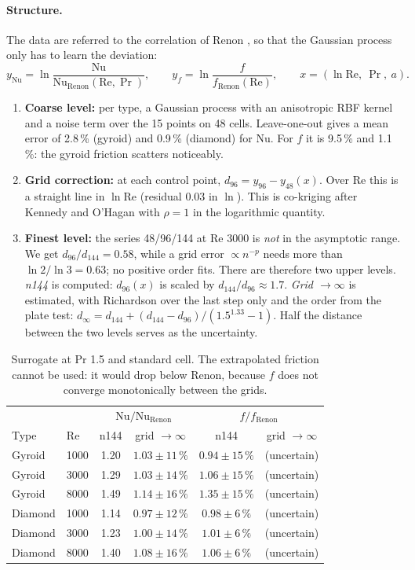 \paragraph{Structure.} The data are referred to the correlation of Renon \cite{renon2024}, so that the Gaussian process
only has to learn the deviation:
\[
  y_\mathrm{Nu} = \ln\frac{\mathrm{Nu}}{\mathrm{Nu}_\mathrm{Renon}(\mathrm{Re},\Pr)},\qquad
  y_f = \ln\frac{f}{f_\mathrm{Renon}(\mathrm{Re})},\qquad x = (\ln\mathrm{Re},\ \Pr,\ a).
\]
\begin{enumerate}
\item \textbf{Coarse level:} per type, a Gaussian process with an anisotropic RBF kernel and a noise term over the 15
  points on 48 cells. Leave-one-out gives a mean error of 2.8\,\% (gyroid) and 0.9\,\% (diamond) for Nu. For $f$ it is
  9.5\,\% and 1.1\,\%: the gyroid friction scatters noticeably.
\item \textbf{Grid correction:} at each control point, $d_{96} = y_{96} - y_{48}(x)$. Over Re this is a straight line in
  $\ln\mathrm{Re}$ (residual 0.03 in $\ln$). This is co-kriging after Kennedy and O'Hagan \cite{kennedy2000} with
  $\rho = 1$ in the logarithmic quantity.
\item \textbf{Finest level:} the series 48/96/144 at Re 3000 is \emph{not} in the asymptotic range. We get
  $d_{96}/d_{144} = 0.58$, while a grid error $\propto n^{-p}$ needs more than $\ln 2/\ln 3 = 0.63$; no positive order
  fits. There are therefore two upper levels. \emph{n144} is computed: $d_{96}(x)$ is scaled by
  $d_{144}/d_{96} \approx 1.7$. \emph{Grid $\to\infty$} is estimated, with Richardson over the last step only and the
  order from the plate test: $d_\infty = d_{144} + (d_{144}-d_{96})/(1.5^{1.33}-1)$. Half the distance between the two
  levels serves as the uncertainty.
\end{enumerate}

\begin{table}[ht]\centering\small
\begin{tabular}{llcccc}\toprule
& & \multicolumn{2}{c}{$\mathrm{Nu}/\mathrm{Nu}_\mathrm{Renon}$} & \multicolumn{2}{c}{$f/f_\mathrm{Renon}$} \\
Type & Re & n144 & grid $\to\infty$ & n144 & grid $\to\infty$ \\\midrule
Gyroid & 1000 & 1.20 & $1.03\pm11\,\%$ & $0.94\pm15\,\%$ & (uncertain) \\
Gyroid & 3000 & 1.29 & $1.03\pm14\,\%$ & $1.06\pm15\,\%$ & (uncertain) \\
Gyroid & 8000 & 1.49 & $1.14\pm16\,\%$ & $1.35\pm15\,\%$ & (uncertain) \\
Diamond & 1000 & 1.14 & $0.97\pm12\,\%$ & $0.98\pm6\,\%$ & (uncertain) \\
Diamond & 3000 & 1.23 & $1.00\pm14\,\%$ & $1.01\pm6\,\%$ & (uncertain) \\
Diamond & 8000 & 1.40 & $1.08\pm16\,\%$ & $1.06\pm6\,\%$ & (uncertain) \\\bottomrule
\end{tabular}
\caption{Surrogate at Pr 1.5 and standard cell. The extrapolated friction cannot be used: it would drop below Renon,
because $f$ does not converge monotonically between the grids.}
\end{table}

